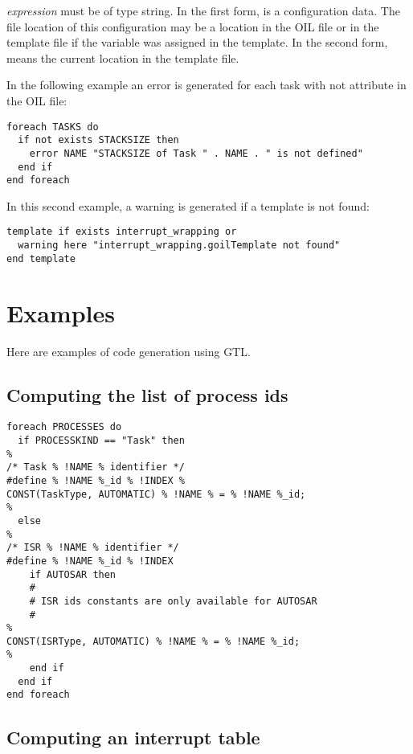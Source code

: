 {\em expression} must be of type string. In the first form,  is a configuration data. The file location of this configuration may be a location in the OIL file or in the template file if the variable was assigned in the template. In the second form,  means the current location in the template file.

In the following example an error is generated for each task with not  attribute in the OIL file:

\begin{lstlisting}
foreach TASKS do
  if not exists STACKSIZE then
    error NAME "STACKSIZE of Task " . NAME . " is not defined"
  end if
end foreach
\end{lstlisting}

In this second example, a warning is generated if a template is not found:

\begin{lstlisting}
template if exists interrupt_wrapping or
  warning here "interrupt_wrapping.goilTemplate not found"
end template
\end{lstlisting}

\section{Examples}

Here are examples of code generation using GTL.

\subsection{Computing the list of process ids}

\begin{lstlisting}
foreach PROCESSES do
  if PROCESSKIND == "Task" then
%
/* Task % !NAME % identifier */
#define % !NAME %_id % !INDEX %
CONST(TaskType, AUTOMATIC) % !NAME % = % !NAME %_id;
%
  else
%
/* ISR % !NAME % identifier */
#define % !NAME %_id % !INDEX 
    if AUTOSAR then
    #
    # ISR ids constants are only available for AUTOSAR
    #
%
CONST(ISRType, AUTOMATIC) % !NAME % = % !NAME %_id;
%
    end if
  end if
end foreach
\end{lstlisting}

\subsection{Computing an interrupt table}

